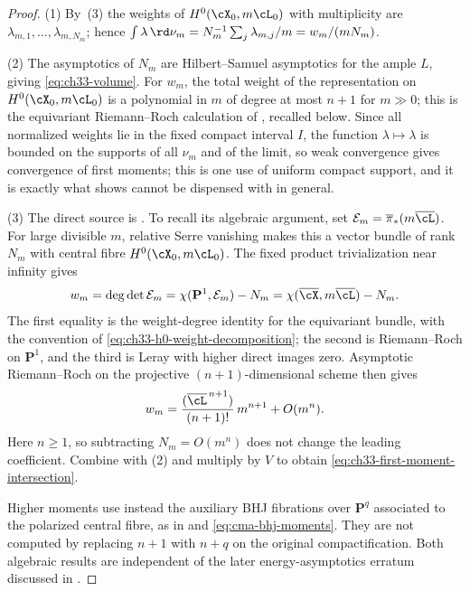 \begin{proof}
(1)  By \,(3) the weights of
$H^0(\cX_0,m\cL_0)$ with multiplicity are $\lambda_{m,1},\dots,
\lambda_{m,N_m}$; hence
$\int\lambda\,\rd\nu_m=N_m^{-1}\sum_j\lambda_{m,j}/m=w_m/(mN_m)$.

(2)  The asymptotics of $N_m$ are Hilbert--Samuel asymptotics for the
ample $L$, giving \eqref{eq:ch33-volume}.  For $w_m$, the total weight
of the representation on $H^0(\cX_0,m\cL_0)$ is a polynomial in $m$ of
degree at most $n+1$ for $m\gg0$; this is the equivariant
Riemann--Roch calculation of
\cite[Proposition~3.12(iii), proof]{BHJ17}, recalled below.  Since all
normalized weights lie in the fixed compact interval $I$, the function
$\lambda\mapsto\lambda$ is bounded on the supports of all $\nu_m$ and
of the limit, so weak convergence gives convergence of first moments; this
is one use of uniform compact support, and it is exactly
what  shows cannot be dispensed with in
general.

(3)  The direct source is
\cite[Proposition~3.12(iii), equation~(3.3)]{BHJ17}.  To recall its
algebraic argument, set
$\mathcal E_m=\overline\pi_\ast(m\overline\cL)$.
For large divisible $m$, relative Serre vanishing makes this a vector
bundle of rank $N_m$ with central fibre $H^0(\cX_0,m\cL_0)$.
The fixed product trivialization near infinity gives
\[
 w_m=\deg\det\mathcal E_m
     =\chi(\mathbf P^1,\mathcal E_m)-N_m
     =\chi(\overline\cX,m\overline\cL)-N_m .
\]
The first equality is the weight-degree identity for the equivariant
bundle, with the convention of \eqref{eq:ch33-h0-weight-decomposition};
the second is Riemann--Roch on $\mathbf P^1$, and the third is Leray
with higher direct images zero.  Asymptotic Riemann--Roch on the
projective $(n+1)$-dimensional scheme then gives
\[
 w_m=\frac{(\overline\cL^{\,n+1})}{(n+1)!}\,m^{n+1}+O(m^n).
\]
Here $n\geq1$, so subtracting $N_m=O(m^n)$ does not change the
leading coefficient.  Combine with (2) and multiply by $V$ to obtain
\eqref{eq:ch33-first-moment-intersection}.

Higher moments use instead the auxiliary BHJ fibrations over
$\mathbf P^q$ associated to the polarized central fibre, as in
\cite[Corollary~3.4]{BHJ17} and \eqref{eq:cma-bhj-moments}.
They are not computed by replacing $n+1$ with $n+q$ on the original
compactification.  Both algebraic results are independent of the later
energy-asymptotics erratum discussed in .

\end{proof}

